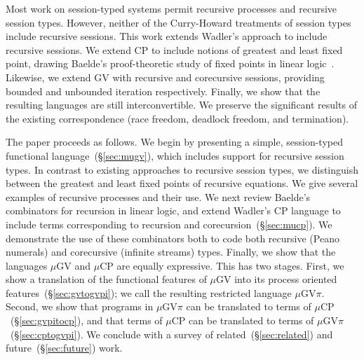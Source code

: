 \documentclass[orivec,envcountsame]{llncs}
\newcommand{\mucp}{$\mu\mathrm{CP}$\xspace}
\newcommand{\mugv}{$\mu\mathrm{GV}$\xspace}
\newcommand{\gvpi}{$\mu\mathrm{GV}\pi$\xspace}
\newcommand{\secref}[1]{(\S\ref{sec:#1})}
\newcommand{\todo}[1]{{\noindent\small\color{red} \framebox{\parbox{\dimexpr\linewidth-2\fboxsep-2\fboxrule}{\textbf{TODO:} #1}}}}
\begin{document}
Most work on session-typed systems permit recursive processes and recursive session types.  However,
neither of the Curry-Howard treatments of session types include recursive sessions.  This work
extends Wadler's approach to include recursive sessions.  We extend CP to include notions of
greatest and least fixed point, drawing Baelde's proof-theoretic study of fixed points in linear
logic~\cite{Baelde12}.  Likewise, we extend GV with recursive and corecursive sessions, providing
bounded and unbounded iteration respectively.  Finally, we show that the resulting languages are
still interconvertible.  We preserve the significant results of the existing correspondence (race
freedom, deadlock freedom, and termination).

The paper proceeds as follows. We begin by presenting a simple, session-typed functional
language~\secref{mugv}, which includes support for recursive session types.  In contrast to existing
approaches to recursive session types, we distinguish between the greatest and least fixed points of
recursive equations.  We give several examples of recursive processes and their use.  We next review
Baelde's combinators for recursion in linear logic, and extend Wadler's CP language to include terms
corresponding to recursion and corecursion~\secref{mucp}.  We demonstrate the use of these
combinators both to code both recursive (Peano numerals) and corecursive (infinite streams)
types. Finally, we show that the languages \mugv and \mucp are equally expressive.  This has two
stages.  First, we show a translation of the functional features of \mugv into its process oriented
features~\secref{gvtogvpi}; we call the resulting restricted language \gvpi.  Second, we show that
programs in \gvpi can be translated to terms of \mucp~\secref{gvpitocp}, and that terms of \mucp can
be translated to terms of \gvpi~\secref{cptogvpi}.  We conclude with a survey of
related~\secref{related} and future~\secref{future} work.

\end{document}
